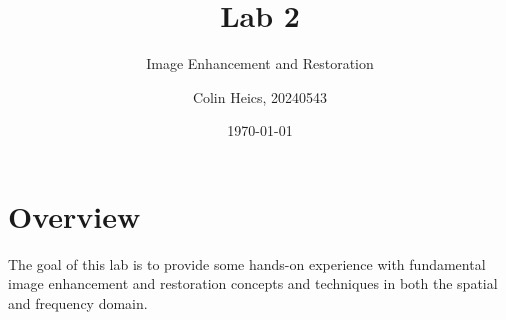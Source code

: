 \documentclass[article, 1.5space, letterpaper, 12pt, oneside, header, footer]{SydeClass}
\title{Lab 2}
\subtitle{Image Enhancement and Restoration}
\author{Colin Heics, 20240543}
\date{\today}
\begin{document}




\section{Overview}
The goal of this lab is to provide some hands-on experience with fundamental image enhancement and restoration concepts and techniques in both the spatial and frequency domain.



















\end{document}
